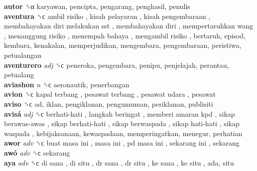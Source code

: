 \textbf{autor} ␝α  karyawan, pencipta, pengarang, penghasil, penulis  \\
\textbf{aventura} ␝ϲ   ambil risiko ,  kisah pelayaran ,  kisah pengembaraan ,  membahayakan diri melakukan sst ,  membahayakan diri ,  mempertaruhkan wang ,  menanggung risiko ,  menempah bahaya ,  mengambil risiko , bertaruh, episod, kembara, kenakalan, memperjudikan, mengembara, pengembaraan, peristiwa, petualangan  \\
\textbf{aventurero} \emph{adj}  ␝ϲ  peneroka, pengembara, penipu, penjelajah, perantau, petualang  \\
\textbf{aviashon} \emph{n}  ␝ϲ  aeronautik, penerbangan  \\
\textbf{avion} ␝ϲ   kapal terbang ,  pesawat terbang ,  pesawat udara , pesawat  \\
\textbf{aviso} ␝ϲ  ad, iklan, pengiklanan, pengumuman, periklanan, publisiti  \\
\textbf{avisá} \emph{adj}  ␝ϲ   berhati-hati ,  langkah beringat ,  memberi amaran kpd ,  sikap berawas-awas ,  sikap berhati-hati ,  sikap berwaspada ,  sikap hati-hati ,  sikap waspada , kebijaksanaan, kewaspadaan, memperingatkan, menegur, perhatian  \\
\textbf{awor} \emph{adv}  ␝ϲ   buat masa ini ,  masa ini ,  pd masa ini ,  sekarang ini , sekarang  \\
\textbf{awó} \emph{adv}  ␝ϲ  sekarang  \\
\textbf{aya} \emph{adv}  ␝ϲ   di sana ,  di situ ,  dr sana ,  dr situ ,  ke sana ,  ke situ , ada, situ  \\
